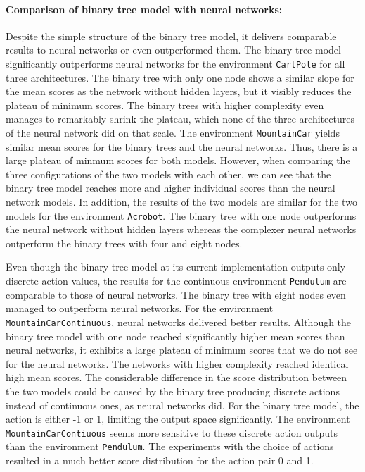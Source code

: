 \paragraph*{Comparison of binary tree model with neural networks:} Despite the simple structure of the binary tree model, it delivers comparable results to neural networks or even outperformed them. The binary tree model significantly outperforms neural networks for the environment \verb|CartPole| for all three architectures. The binary tree with only one node shows a similar slope for the mean scores as the network without hidden layers, but it visibly reduces the plateau of minimum scores. The binary trees with higher complexity even manages to remarkably shrink the plateau, which none of the three architectures of the neural network did on that scale. The environment \verb|MountainCar| yields similar mean scores for the binary trees and the neural networks. Thus, there is a large plateau of minmum scores for both models. However, when comparing the three configurations of the two models with each other, we can see that the binary tree model reaches more and higher individual scores than the neural network models. In addition, the results of the two models are similar for the two models for the environment \verb|Acrobot|. The binary tree with one node outperforms the neural network without hidden layers whereas the complexer neural networks outperform the binary trees with four and eight nodes.

Even though the binary tree model at its current implementation outputs only discrete action values, the results for the continuous environment \verb|Pendulum| are comparable to those of neural networks. The binary tree with eight nodes even managed to outperform neural networks. For the environment \verb|MountainCarContinuous|, neural networks delivered better results. Although the binary tree model with one node reached significantly higher mean scores than neural networks, it exhibits a large plateau of minimum scores that we do not see for the neural networks. The networks with higher complexity reached identical high mean scores. The considerable difference in the score distribution between the two models could be caused by the binary tree producing discrete actions instead of continuous ones, as neural networks did. For the binary tree model, the action is either -1 or 1, limiting the output space significantly. The environment \verb|MountainCarContiuous| seems more sensitive to these discrete action outputs than the environment \verb|Pendulum|. The experiments with the choice of actions resulted in a much better score distribution for the action pair 0 and 1.


